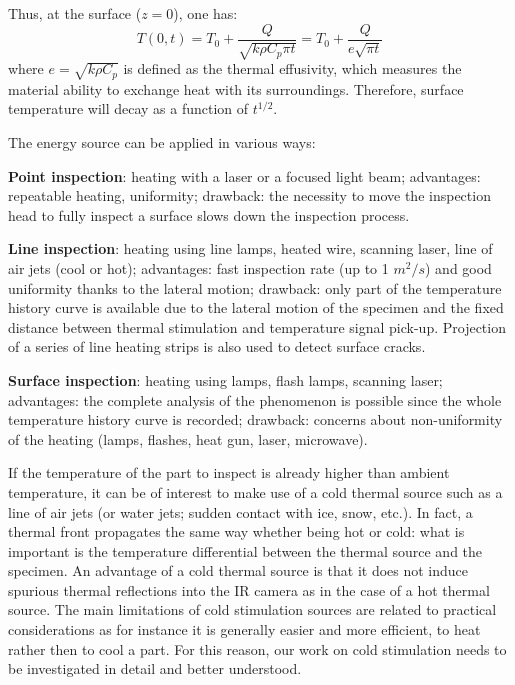 Thus, at the surface ($z=0$), one has:
\begin{equation}
T(0,t) = T_0 + \frac{Q}{\sqrt{k\rho C_p \pi t}}=T_0 + \frac{Q}{e\sqrt{\pi t}}
\label{PT_eq}
\end{equation}
where $e=\sqrt{k\rho C_p}$ is defined as the thermal effusivity, which measures the material ability to exchange heat with its surroundings. Therefore, surface temperature will decay as a function of $t^{1/2}$.

\noindent The energy source can be applied in various ways:
\begin{description}
	\item \textbf{Point inspection}: heating with a laser or a focused light beam; advantages: repeatable heating, uniformity; drawback: the necessity to move the inspection head to fully inspect a surface slows down the inspection process.
	\item \textbf{Line inspection}: heating using line lamps, heated wire, scanning laser, line of air jets (cool or hot); advantages: fast inspection rate (up to 1 $m^2/s$) and good uniformity thanks to the lateral motion; drawback: only part of the temperature history curve is available due to the lateral motion of the specimen and the fixed distance between thermal stimulation and temperature signal pick-up. Projection of a series of line heating strips is also used to detect surface cracks.
	\item \textbf{Surface inspection}: heating using lamps, flash lamps, scanning laser; advantages: the complete analysis of the phenomenon is possible since the whole temperature history curve is recorded; drawback: concerns about non-uniformity of the heating (lamps, flashes, heat gun, laser, microwave).
\end{description}

If the temperature of the part to inspect is already higher than ambient temperature, it can be of interest to make use of a cold thermal source such as a line of air jets (or water jets; sudden contact with ice, snow, etc.). In fact, a thermal front propagates the same way whether being hot or cold: what is important is the temperature differential between the thermal source and the specimen. An advantage of a cold thermal source is that it does not induce spurious thermal reflections into the IR camera as in the case of a hot thermal source. The main limitations of cold stimulation sources are related to practical considerations as for instance it is generally easier and more efficient, to heat rather then to cool a part. For this reason, our work on cold stimulation needs to be investigated in detail and better understood.

